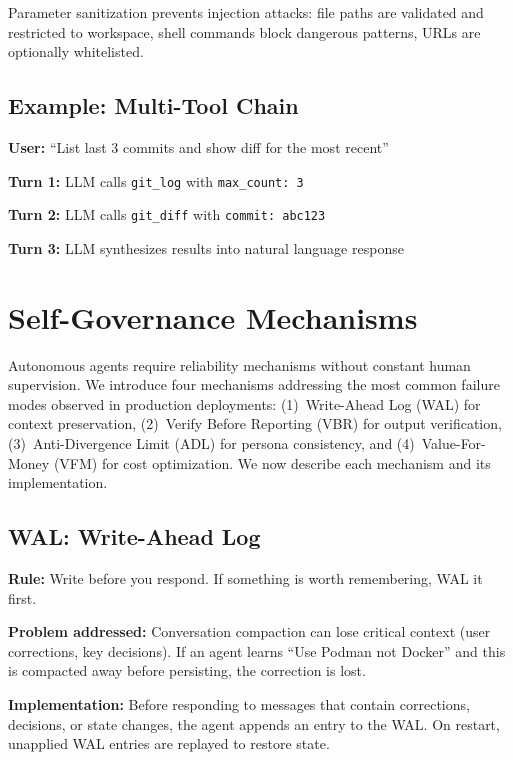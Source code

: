 \documentclass[conference]{IEEEtran}
\begin{document}
Parameter sanitization prevents injection attacks: file paths are validated and restricted to workspace, shell commands block dangerous patterns, URLs are optionally whitelisted.

\subsection{Example: Multi-Tool Chain}

\textbf{User:} ``List last 3 commits and show diff for the most recent''

\textbf{Turn 1:} LLM calls \texttt{git\_log} with \texttt{max\_count: 3}

\textbf{Turn 2:} LLM calls \texttt{git\_diff} with \texttt{commit: abc123}

\textbf{Turn 3:} LLM synthesizes results into natural language response



\section{Self-Governance Mechanisms}
\label{sec:governance}

Autonomous agents require reliability mechanisms without constant human supervision. We introduce four mechanisms addressing the most common failure modes observed in production deployments: (1)~Write-Ahead Log (WAL) for context preservation, (2)~Verify Before Reporting (VBR) for output verification, (3)~Anti-Divergence Limit (ADL) for persona consistency, and (4)~Value-For-Money (VFM) for cost optimization. We now describe each mechanism and its implementation.

\subsection{WAL: Write-Ahead Log}

\textbf{Rule:} Write before you respond. If something is worth remembering, WAL it first.

\textbf{Problem addressed:} Conversation compaction can lose critical context (user corrections, key decisions). If an agent learns ``Use Podman not Docker'' and this is compacted away before persisting, the correction is lost.

\textbf{Implementation:} Before responding to messages that contain corrections, decisions, or state changes, the agent appends an entry to the WAL. On restart, unapplied WAL entries are replayed to restore state.
\end{document}
